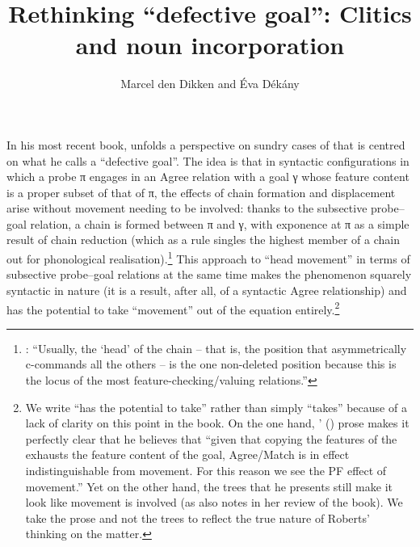 \documentclass[output=paper]{langsci/langscibook}
\author{Marcel den Dikken\affiliation{Eötvös University \& RIL HAS} and
Éva Dékány\affiliation{RIL HAS}}
\title{Rethinking ``defective goal'': Clitics and noun incorporation}
\begin{document}
\glsresetall
\maketitle
\begin{refcontext}

In his most recent book, \citet{Roberts2010} unfolds a perspective on sundry cases
of  that is centred on what he calls a \enquote{defective goal}.
The idea is that in syntactic configurations in which a probe π engages in
an Agree relation with a goal γ whose feature content is a proper subset
of that of π, the effects of chain formation and displacement arise without
movement needing to be involved: thanks to the subsective probe--goal relation,
a chain is formed between π and γ, with exponence at π as a
simple result of chain reduction (which as a rule singles the highest member of
a chain out for phonological realisation).\footnote{\citet[61]{Roberts2010}:
    \enquote{Usually, the \enquote{head} of the chain -- that is, the
        position that asymmetrically c-commands all the others -- is the one
        non-deleted position because this is the locus of the most
        feature-checking/valuing relations.}} This approach to \enquote{head
    movement} in terms of subsective probe–goal relations at the same time
    makes the phenomenon squarely syntactic in nature (it is a result, after
    all, of a syntactic Agree relationship) and has the potential to take
    \enquote{movement} out of the equation entirely.\footnote{We write
        \enquote{has the potential to take} rather than simply
        \enquote{takes} because of a lack of clarity on this point in the
        book. On the one hand, \citeauthor{Roberts2010}'
        (\citeyear[160]{Roberts2010}) prose makes it perfectly clear that he
        believes that \enquote{given that copying the features of the
             exhausts the feature content of the goal,
        Agree/Match is in effect indistinguishable from movement. For this
    reason we see the PF effect of movement.} Yet on the other hand, the trees
    that he presents still make it look like movement is involved (as
    \citealt{matushanskyrobertsreview} also notes in her review of the book).
    We take the prose and not the trees to reflect the true nature of Roberts’
thinking on the matter.}


\end{refcontext}
\end{document}
